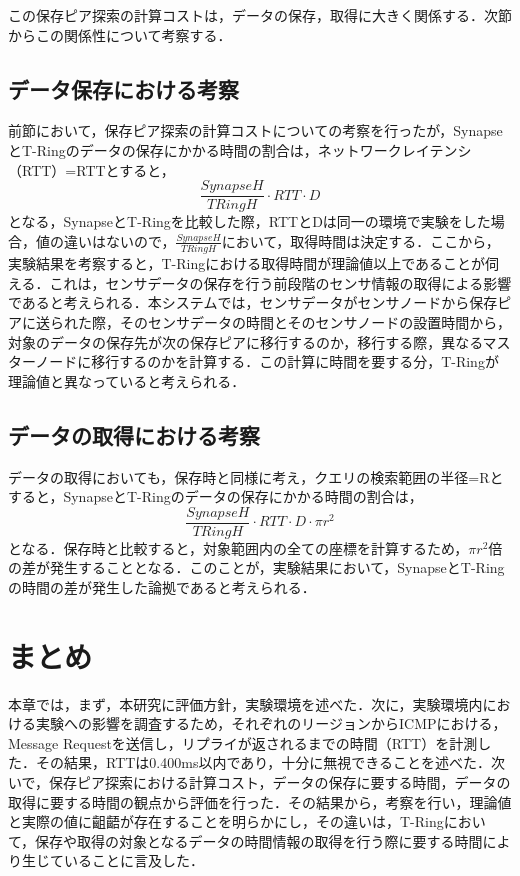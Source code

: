 この保存ピア探索の計算コストは，データの保存，取得に大きく関係する．次節からこの関係性について考察する．
\subsection{データ保存における考察}
前節において，保存ピア探索の計算コストについての考察を行ったが，SynapseとT-Ringのデータの保存にかかる時間の割合は，ネットワークレイテンシ（RTT）=RTTとすると，
\begin{equation}
\frac{SynapseH}{TRingH} \cdot RTT \cdot D \label{6}
\end{equation}
となる，SynapseとT-Ringを比較した際，RTTとDは同一の環境で実験をした場合，値の違いはないので，$\frac{SynapseH}{TRingH}$において，取得時間は決定する．ここから，実験結果を考察すると，T-Ringにおける取得時間が理論値以上であることが伺える．これは，センサデータの保存を行う前段階のセンサ情報の取得による影響であると考えられる．本システムでは，センサデータがセンサノードから保存ピアに送られた際，そのセンサデータの時間とそのセンサノードの設置時間から，対象のデータの保存先が次の保存ピアに移行するのか，移行する際，異なるマスターノードに移行するのかを計算する．この計算に時間を要する分，T-Ringが理論値と異なっていると考えられる．

\subsection{データの取得における考察}
データの取得においても，保存時と同様に考え，クエリの検索範囲の半径=Rとすると，SynapseとT-Ringのデータの保存にかかる時間の割合は，
\begin{equation}
\frac{SynapseH}{TRingH} \cdot RTT \cdot D \cdot  \pi r^{2}  \label{7}
\end{equation}
となる．保存時と比較すると，対象範囲内の全ての座標を計算するため，$\pi r^{2}$倍の差が発生することとなる．このことが，実験結果において，SynapseとT-Ringの時間の差が発生した論拠であると考えられる．

\section{まとめ}
本章では，まず，本研究に評価方針，実験環境を述べた．次に，実験環境内における実験への影響を調査するため，それぞれのリージョンからICMPにおける，Message Requestを送信し，リプライが返されるまでの時間（RTT）を計測した．その結果，RTTは0.400ms以内であり，十分に無視できることを述べた．次いで，保存ピア探索における計算コスト，データの保存に要する時間，データの取得に要する時間の観点から評価を行った．その結果から，考察を行い，理論値と実際の値に齟齬が存在することを明らかにし，その違いは，T-Ringにおいて，保存や取得の対象となるデータの時間情報の取得を行う際に要する時間により生じていることに言及した．
